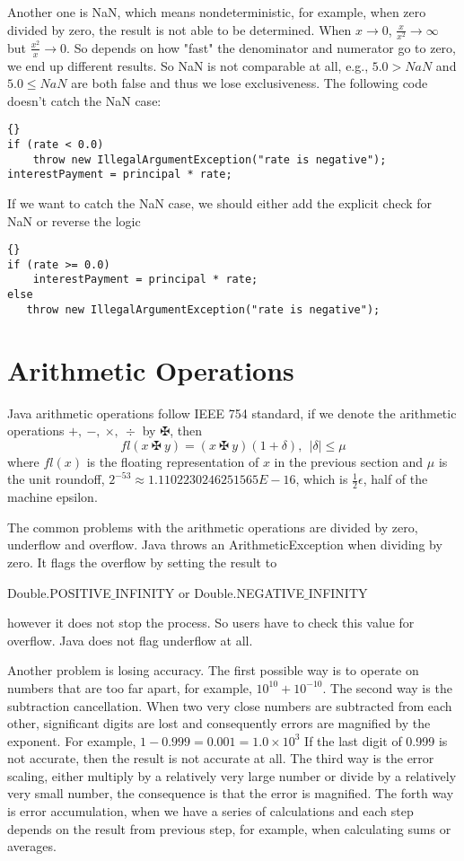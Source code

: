 Another one is NaN, which means nondeterministic, for example, when zero divided by zero, the result is not able to be determined. When $x \rightarrow 0$, $\frac{x}{x^2} \rightarrow \infty$ but $\frac{x^2}{x} \rightarrow 0$. So depends on how "fast" the denominator and numerator go to zero, we end up different results. So NaN is not comparable at all, e.g., $5.0 > NaN$ and $5.0 \leq NaN$ are both false and thus we lose exclusiveness. The following code doesn't catch the NaN case:
\begin{lstlisting}[frame=trbl]{}
if (rate < 0.0)
    throw new IllegalArgumentException("rate is negative");
interestPayment = principal * rate;
\end{lstlisting}
If we want to catch the NaN case, we should either add the explicit check for NaN or reverse the logic
\begin{lstlisting}[frame=trbl]{}
if (rate >= 0.0)    
	interestPayment = principal * rate;
else
   throw new IllegalArgumentException("rate is negative");
\end{lstlisting}



\section{Arithmetic Operations}

Java arithmetic operations follow IEEE 754 standard, if we denote the arithmetic operations $+, \ -, \ \times, \ \div$ by $\maltese$, then
\[ fl{(x \ \maltese \ y)} = (x \ \maltese \ y) (1 + \delta), \ \ |\delta| \leqslant \mu \]
where $fl(x)$ is the floating representation of $x$ in the previous section and $\mu$ is the unit roundoff, $2^{-53} \approx 1.1102230246251565E-16$, which is $\frac{1}{2}\epsilon$, half of the machine epsilon. 

The common problems with the arithmetic operations are divided by zero, underflow and overflow. Java throws an ArithmeticException when dividing by zero. It flags the overflow by setting the result to 
\begin{center}
Double.POSITIVE$\_$INFINITY or Double.NEGATIVE$\_$INFINITY
\end{center}
however it does not stop the process. So users have to check this value for overflow. Java does not flag underflow at all.

Another problem is losing accuracy. The first possible way is to operate on numbers that are too far apart, for example, $10^{10} + 10^{-10}$. The second way is the subtraction cancellation. When two very close numbers are subtracted from each other, significant digits are lost and consequently errors are magnified by the exponent. For example, $1 - 0.999 = 0.001 = 1.0 \times 10^3$ If the last digit of 0.999 is not accurate, then the result is not accurate at all. The third way is the error scaling, either multiply by a relatively very large number or divide by a relatively very small number, the consequence is that the error is magnified.
The forth way is error accumulation, when we have a series of calculations and each step depends on the result from previous step, for example, when calculating sums or averages.

